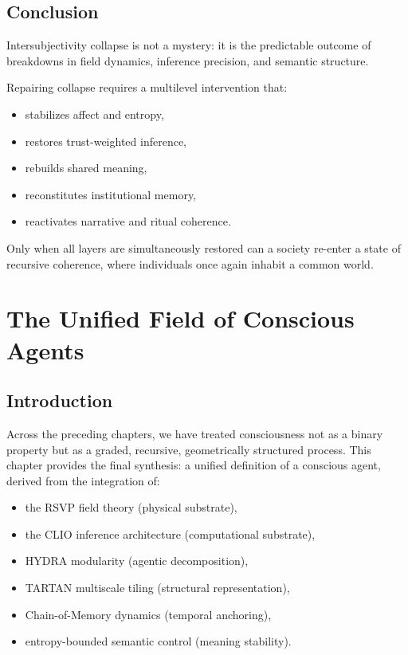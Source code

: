 \documentclass[12pt,oneside]{book}
\theoremstyle{plain}
\theoremstyle{definition}
\begin{document}
\section{Conclusion}

Intersubjectivity collapse is not a mystery:  
it is the predictable outcome of breakdowns in field dynamics, inference precision, 
and semantic structure.

Repairing collapse requires a multilevel intervention that:

\begin{itemize}
    \item stabilizes affect and entropy,
    \item restores trust-weighted inference,
    \item rebuilds shared meaning,
    \item reconstitutes institutional memory,
    \item reactivates narrative and ritual coherence.
\end{itemize}

Only when all layers are simultaneously restored can a society re-enter a 
state of recursive coherence, where individuals once again inhabit a common world.

\chapter{The Unified Field of Conscious Agents}

\section{Introduction}

Across the preceding chapters, we have treated consciousness not as a binary 
property but as a graded, recursive, geometrically structured process.  
This chapter provides the final synthesis:  
a unified definition of a conscious agent, derived from the integration of:

\begin{itemize}
    \item the RSVP field theory (physical substrate),
    \item the CLIO inference architecture (computational substrate),
    \item HYDRA modularity (agentic decomposition),
    \item TARTAN multiscale tiling (structural representation),
    \item Chain-of-Memory dynamics (temporal anchoring),
    \item entropy-bounded semantic control (meaning stability).
\end{itemize}
\end{document}
